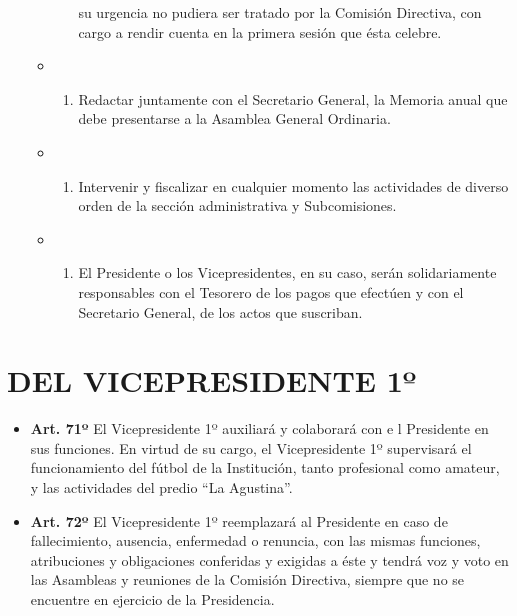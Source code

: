 \documentclass[]{book}
\providecommand{\tightlist}{%
  \setlength{\itemsep}{0pt}\setlength{\parskip}{0pt}}
\begin{document}
\begin{itemize}
\begin{itemize}
\begin{enumerate}
      su urgencia no pudiera ser tratado por la Comisión Directiva, con
      cargo a rendir cuenta en la primera sesión que ésta celebre.
    \end{enumerate}
  \item
    \begin{enumerate}
    \def\labelenumi{\alph{enumi})}
    \setcounter{enumi}{10}
    \tightlist
    \item
      Redactar juntamente con el Secretario General, la Memoria anual
      que debe presentarse a la Asamblea General Ordinaria.
    \end{enumerate}
  \item
    \begin{enumerate}
    \def\labelenumi{\alph{enumi})}
    \setcounter{enumi}{11}
    \tightlist
    \item
      Intervenir y fiscalizar en cualquier momento las actividades de
      diverso orden de la sección administrativa y Subcomisiones.
    \end{enumerate}
  \item
    \begin{enumerate}
    \def\labelenumi{\alph{enumi})}
    \setcounter{enumi}{12}
    \tightlist
    \item
      El Presidente o los Vicepresidentes, en su caso, serán
      solidariamente responsables con el Tesorero de los pagos que
      efectúen y con el Secretario General, de los actos que suscriban.
    \end{enumerate}
  \end{itemize}
\end{itemize}

\chapter{DEL VICEPRESIDENTE 1º}\label{cap9}

\begin{itemize}
\tightlist
\item
  \textbf{Art. 71º} El Vicepresidente 1º auxiliará y colaborará con e l
  Presidente en sus funciones. En virtud de su cargo, el Vicepresidente
  1º supervisará el funcionamiento del fútbol de la Institución, tanto
  profesional como amateur, y las actividades del predio ``La
  Agustina''.
\end{itemize}

\begin{itemize}
\tightlist
\item
  \textbf{Art. 72º} El Vicepresidente 1º reemplazará al Presidente en
  caso de fallecimiento, ausencia, enfermedad o renuncia, con las mismas
  funciones, atribuciones y obligaciones conferidas y exigidas a éste y
  tendrá voz y voto en las Asambleas y reuniones de la Comisión
  Directiva, siempre que no se encuentre en ejercicio de la Presidencia.
\end{itemize}
\end{document}
